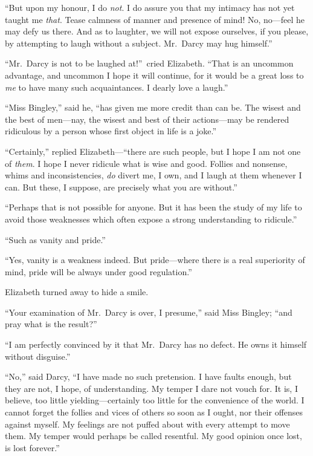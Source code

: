 \documentclass[12pt,english]{book}
\begin{document}
{}``But upon my honour, I do \textit{not}. I do assure you that my
intimacy has not yet taught me \textit{that}. Tease calmness of manner
and presence of mind! No, no\mbox{---}feel he may defy us there.
And as to laughter, we will not expose ourselves, if you please, by
attempting to laugh without a subject. Mr.\ Darcy may hug himself.''

{}``Mr.\ Darcy is not to be laughed at!''\ cried Elizabeth. {}``That
is an uncommon advantage, and uncommon I hope it will continue, for
it would be a great loss to \textit{me} to have many such acquaintances.
I dearly love a laugh.''

{}``Miss Bingley,'' said he, {}``has given me more credit than
can be. The wisest and the best of men\mbox{---}nay, the wisest and
best of their actions\mbox{---}may be rendered ridiculous by a person
whose first object in life is a joke.''

{}``Certainly,'' replied Elizabeth\mbox{---}{}``there are such
people, but I hope I am not one of \textit{them}. I hope I never ridicule
what is wise and good. Follies and nonsense, whims and inconsistencies,
\textit{do} divert me, I own, and I laugh at them whenever I can.
But these, I suppose, are precisely what you are without.''

{}``Perhaps that is not possible for anyone. But it has been the
study of my life to avoid those weaknesses which often expose a strong
understanding to ridicule.''

{}``Such as vanity and pride.''

{}``Yes, vanity is a weakness indeed. But pride\mbox{---}where there
is a real superiority of mind, pride will be always under good regulation.''

Elizabeth turned away to hide a smile.

{}``Your examination of Mr.\ Darcy is over, I presume,'' said Miss
Bingley; {}``and pray what is the result?''\ 

{}``I am perfectly convinced by it that Mr.\ Darcy has no defect.
He owns it himself without disguise.''

{}``No,'' said Darcy, {}``I have made no such pretension. I have
faults enough, but they are not, I hope, of understanding. My temper
I dare not vouch for. It is, I believe, too little yielding\mbox{---}certainly
too little for the convenience of the world. I cannot forget the follies
and vices of others so soon as I ought, nor their offenses against
myself. My feelings are not puffed about with every attempt to move
them. My temper would perhaps be called resentful. My good opinion
once lost, is lost forever.''
\end{document}
